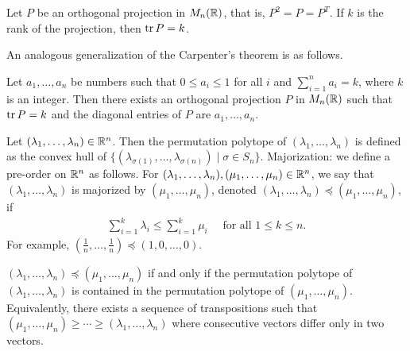 \begin{theorem}
    Let $P$ be an orthogonal projection in $M_{n}(\mathbb{R})$, that is, $P^{2} = P = P^{T}$. If $k$ is the rank of the projection, then $\operatorname{tr} P = k$.
\end{theorem}

An analogous generalization of the Carpenter's theorem is as follows.

\begin{theorem}
    Let $a_{1},\ldots,a_{n}$ be numbers such that $0 \leq a_{i} \leq 1$ for all $i$ and $\sum_{i=1}^{n} a_{i} = k$, where $k$ is an integer. Then there exists an orthogonal projection $P$ in $M_{n}(\mathbb{R})$ such that $\operatorname{tr} P = k$ and the diagonal entries of $P$ are $a_{1},\ldots,a_{n}$.
\end{theorem}

Let $(\lambda_{1},\ldots,\lambda_{n}) \in \mathbb{R}^{n}$. Then the permutation polytope of $(\lambda_{1},\ldots,\lambda_{n})$ is defined as the convex hull of $\{(\lambda_{\sigma(1)},\ldots,\lambda_{\sigma(n)}) \mid \sigma \in S_{n}\}$. Majorization: we define a pre-order on $\mathbb{R}^{n}$ as follows. For $(\lambda_{1},\ldots,\lambda_{n}), (\mu_{1},\ldots,\mu_{n}) \in \mathbb{R}^{n}$, we say that $(\lambda_{1},\ldots,\lambda_{n})$ is majorized by $(\mu_{1},\ldots,\mu_{n})$, denoted $(\lambda_{1},\ldots,\lambda_{n}) \preceq (\mu_{1},\ldots,\mu_{n})$, if
\begin{align}
    \sum_{i=1}^{k} \lambda_{i} \leq \sum_{i=1}^{k} \mu_{i} \quad \text{ for all } 1 \leq k \leq n.
\end{align}
For example, $(\frac{1}{n},\ldots,\frac{1}{n}) \preceq (1,0,\ldots,0)$.

\begin{theorem}
    $(\lambda_{1},\ldots,\lambda_{n}) \preceq (\mu_{1},\ldots,\mu_{n})$ if and only if the permutation polytope of $(\lambda_{1},\ldots,\lambda_{n})$ is contained in the permutation polytope of $(\mu_{1},\ldots,\mu_{n})$. Equivalently, there exists a sequence of transpositions such that $(\mu_{1},\ldots,\mu_{n}) \geq \cdots \geq (\lambda_{1},\ldots,\lambda_{n})$ where consecutive vectors differ only in two vectors.
\end{theorem}